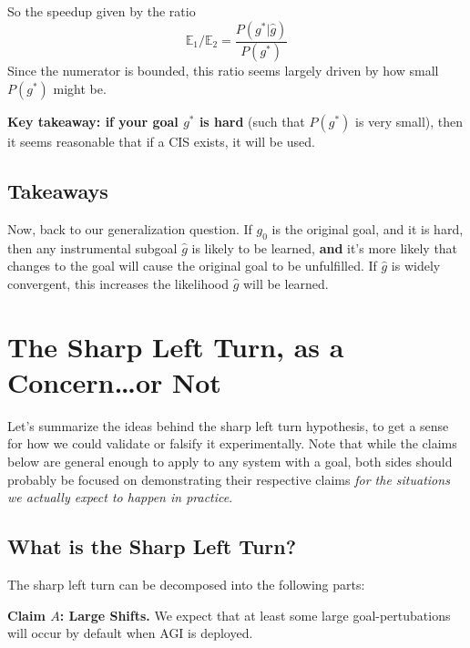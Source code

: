\documentclass{article}
\begin{document}
So the speedup given by the ratio
\[
\mathbb{E}_1 / \mathbb{E}_2 = \frac{P(g^*|\hat{g})}{P(g^*)}
\]
Since the numerator is bounded, this ratio seems largely driven by how small $P(g^*)$ might be.

\textbf{Key takeaway: if your goal $g^*$ is hard} (such that $P(g^*)$ is very small), then it seems reasonable that if a CIS exists, it will be used.

\subsection{Takeaways}
Now, back to our generalization question. If $g_0$ is the original goal, and it is hard, then any instrumental subgoal $\hat{g}$ is likely to be learned, \textbf{and} it's more likely that changes to the goal will cause the original goal to be unfulfilled. If $\hat{g}$ is widely convergent, this increases the likelihood $\hat{g}$ will be learned.


\section{The Sharp Left Turn, as a Concern\ldots or Not}
Let's summarize the ideas behind the sharp left turn hypothesis, to get a sense for how we could validate or falsify it experimentally. Note that while the claims below are general enough to apply to any system with a goal, both sides should probably be focused on demonstrating their respective claims \emph{for the situations we actually expect to happen in practice}. 

\subsection{What is the Sharp Left Turn?} 
The sharp left turn can be decomposed into the following parts:

\textbf{Claim $A$: Large Shifts.} We expect that at least some large goal-pertubations will occur by default when AGI is deployed.
\end{document}
